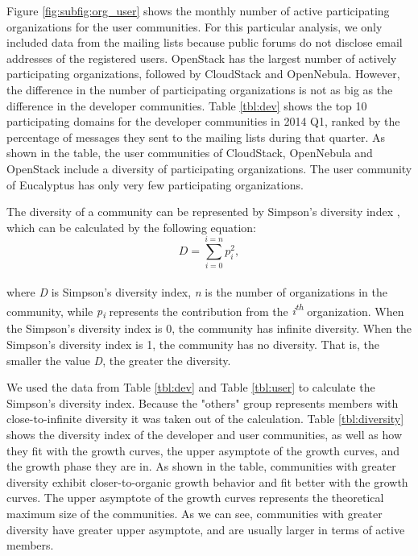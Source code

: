 \documentclass[conference]{IEEEtran}
\begin{document}
Figure \ref{fig:subfig:org_user} shows the monthly number of active participating organizations for the user communities. For this particular analysis, we only included data from the mailing lists because public forums do not disclose email addresses of the registered users. OpenStack has the largest number of actively participating organizations, followed by CloudStack and OpenNebula. However, the difference in the number of participating organizations is not as big as the difference in the developer communities. Table \ref{tbl:dev} shows the top 10 participating domains for the developer communities in 2014 Q1, ranked by the percentage of messages they sent to the mailing lists during that quarter. As shown in the table, the user communities of CloudStack, OpenNebula and OpenStack include a diversity of participating organizations. The user community of Eucalyptus has only very few participating organizations.

The diversity of a community can be represented by Simpson's diversity index \cite{c7}, which can be calculated by the following equation:
\begin{equation}
\label{eq:diversity}
D=\sum_{i=0}^{i=n} p_{i}^{2},
\end{equation}
\\where \textit{D} is Simpson's diversity index, \textit{n} is the number of organizations in the community, while \textit{p\textsubscript{i}} represents the contribution from the \textit{i\textsuperscript{th}} organization. When the Simpson's diversity index is 0, the community has infinite diversity. When the Simpson's diversity index is 1, the community has no diversity. That is, the smaller the value \textit{D}, the greater the diversity. 

We used the data from Table \ref{tbl:dev} and Table \ref{tbl:user} to calculate the Simpson's diversity index. Because the "others" group represents members with close-to-infinite diversity it was taken out of the calculation. Table \ref{tbl:diversity} shows the diversity index of the developer and user communities, as well as how they fit with the growth curves, the upper asymptote of the growth curves, and the growth phase they are in. As shown in the table, communities with greater diversity exhibit closer-to-organic growth behavior and fit better with the growth curves. The upper asymptote of the growth curves represents the theoretical maximum size of the communities. As we can see, communities with greater diversity have greater upper asymptote, and are usually larger in terms of active members. 
\end{document}
